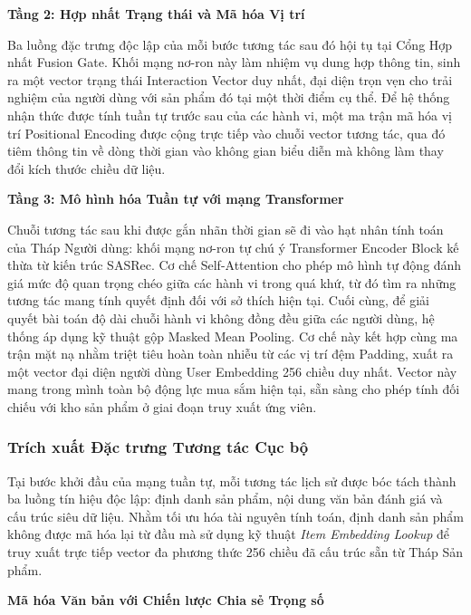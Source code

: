 \vspace{0.3cm}
\noindent \textbf{Tầng 2: Hợp nhất Trạng thái và Mã hóa Vị trí}

Ba luồng đặc trưng độc lập của mỗi bước tương tác sau đó hội tụ tại Cổng Hợp nhất Fusion Gate. Khối mạng nơ-ron này làm nhiệm vụ dung hợp thông tin, sinh ra một vector trạng thái Interaction Vector duy nhất, đại diện trọn vẹn cho trải nghiệm của người dùng với sản phẩm đó tại một thời điểm cụ thể. Để hệ thống nhận thức được tính tuần tự trước sau của các hành vi, một ma trận mã hóa vị trí Positional Encoding được cộng trực tiếp vào chuỗi vector tương tác, qua đó tiêm thông tin về dòng thời gian vào không gian biểu diễn mà không làm thay đổi kích thước chiều dữ liệu.

\vspace{0.3cm}
\noindent \textbf{Tầng 3: Mô hình hóa Tuần tự với mạng Transformer}

Chuỗi tương tác sau khi được gắn nhãn thời gian sẽ đi vào hạt nhân tính toán của Tháp Người dùng: khối mạng nơ-ron tự chú ý Transformer Encoder Block kế thừa từ kiến trúc SASRec. Cơ chế Self-Attention cho phép mô hình tự động đánh giá mức độ quan trọng chéo giữa các hành vi trong quá khứ, từ đó tìm ra những tương tác mang tính quyết định đối với sở thích hiện tại. Cuối cùng, để giải quyết bài toán độ dài chuỗi hành vi không đồng đều giữa các người dùng, hệ thống áp dụng kỹ thuật gộp Masked Mean Pooling. Cơ chế này kết hợp cùng ma trận mặt nạ nhằm triệt tiêu hoàn toàn nhiễu từ các vị trí đệm Padding, xuất ra một vector đại diện người dùng User Embedding 256 chiều duy nhất. Vector này mang trong mình toàn bộ động lực mua sắm hiện tại, sẵn sàng cho phép tính đối chiếu với kho sản phẩm ở giai đoạn truy xuất ứng viên.

\subsubsection{Trích xuất Đặc trưng Tương tác Cục bộ}

Tại bước khởi đầu của mạng tuần tự, mỗi tương tác lịch sử được bóc tách thành ba luồng tín hiệu độc lập: định danh sản phẩm, nội dung văn bản đánh giá và cấu trúc siêu dữ liệu. Nhằm tối ưu hóa tài nguyên tính toán, định danh sản phẩm không được mã hóa lại từ đầu mà sử dụng kỹ thuật \textit{Item Embedding Lookup} để truy xuất trực tiếp vector đa phương thức 256 chiều đã cấu trúc sẵn từ Tháp Sản phẩm.

\vspace{0.3cm}
\noindent \textbf{Mã hóa Văn bản với Chiến lược Chia sẻ Trọng số}

